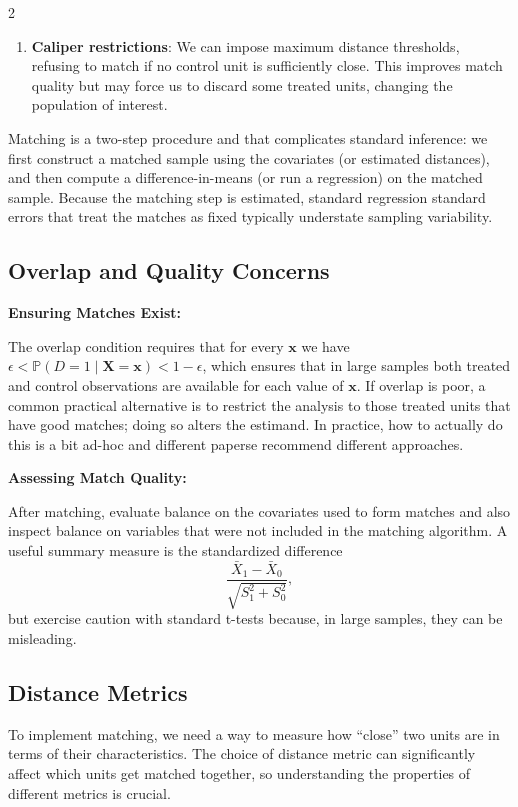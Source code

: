 \documentclass[12pt]{article}
\begin{document}
\begin{multicols}{2}
\begin{enumerate}
  \item \textbf{Caliper restrictions}: We can impose maximum distance thresholds, refusing to match if no control unit is sufficiently close.
  This improves match quality but may force us to discard some treated units, changing the population of interest.
\end{enumerate}

Matching is a two-step procedure and that complicates standard inference: we first construct a matched sample using the covariates (or estimated distances), and then compute a difference-in-means (or run a regression) on the matched sample. 
Because the matching step is estimated, standard regression standard errors that treat the matches as fixed typically understate sampling variability.

\subsection*{Overlap and Quality Concerns}

\textbf{Ensuring Matches Exist:}

The overlap condition requires that for every $\bm{x}$ we have $\epsilon < \mathbb{P}(D=1 \mid \bm{X}=\bm{x}) < 1-\epsilon$, which ensures that in large samples both treated and control observations are available for each value of $\bm{x}$. 
If overlap is poor, a common practical alternative is to restrict the analysis to those treated units that have good matches; doing so alters the estimand.
In practice, how to actually do this is a bit ad-hoc and different paperse recommend different approaches.

\textbf{Assessing Match Quality:}

After matching, evaluate balance on the covariates used to form matches and also inspect balance on variables that were not included in the matching algorithm. A useful summary measure is the standardized difference
\[
\frac{\bar{X}_1 - \bar{X}_0}{\sqrt{S_1^2 + S_0^2}},
\]
but exercise caution with standard t-tests because, in large samples, they can be misleading.

\subsection*{Distance Metrics}

To implement matching, we need a way to measure how ``close'' two units are in terms of their characteristics.
The choice of distance metric can significantly affect which units get matched together, so understanding the properties of different metrics is crucial.


\end{multicols}
\end{document}
